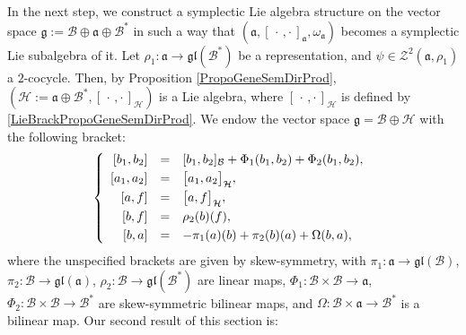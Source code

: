 \documentclass[final,1p,times,nopreprintline]{elsarticle}
\theoremstyle{definition}
\numberwithin{equation}{section}
\newcommand{\w}{\omega}
\newcommand{\g}{\mathfrak{g}}
\newcommand{\ai}{\mathfrak{a}}
\newcommand{\h}{\mathcal{H}}
\numberwithin{equation}{section}
\newcommand{\gl}{\mathfrak{gl}}
\newcommand{\cro}{[\,\cdot\,,\cdot\,]}
\newcommand{\bi}{\mathcal{B}}
\begin{document}
In the next step, we construct a symplectic Lie algebra structure on the vector space $\g := \bi \oplus \ai \oplus \bi^*$ in such a way that $(\ai, \cro_\ai, \w_\ai)$ becomes a symplectic Lie subalgebra of it. Let $\rho_1:\ai\to\gl(\bi^*)$ be a representation, and $\psi\in\mathcal{Z}^2(\ai,\rho_1)$ a $2$-cocycle. Then, by Proposition \ref{PropoGeneSemDirProd}, $(\h:=\ai\oplus\bi^*,\cro_\h)$ is a Lie algebra, where $\cro_\h$ is defined by \eqref{LieBrackPropoGeneSemDirProd}. We endow the vector space $\g=\bi\oplus\h$ with the following bracket:
\begin{equation}\label{LiBraDobExtensGeneral}
	\left\{
	\begin{array}{r c l}\vspace{1mm}
		\left[b_1,b_2\right]&=&[b_1,b_2]_\bi+\Phi_1(b_1,b_2)+\Phi_2(b_1,b_2),\\\vspace{1mm}
		\left[a_1,a_2\right]&=&\big[a_1,a_2\big]_\h,\\\vspace{1mm}
		\left[a,f\right]&=&\big[a,f\big]_\h,\\\vspace{1mm}
		\left[b,f\right]&=&\rho_2(b)(f),\hfill\\
		\left[b,a\right]&=&-\pi_1(a)(b)+\pi_2(b)(a)+\Omega(b,a),
	\end{array}
	\right.\\
\end{equation}
where the unspecified brackets are given by skew-symmetry, with $\pi_1:\ai\to\gl(\bi)$, $\pi_2:\bi\to\gl(\ai)$, $\rho_2:\bi\to\gl(\bi^*)$ are linear maps, $\Phi_1:\bi\times\bi\to\ai$, $\Phi_2:\bi\times\bi\to\bi^*$ are skew-symmetric bilinear maps, and $\Omega:\bi\times\ai\to\bi^*$ is a bilinear map. Our second result of this section is:
\end{document}

